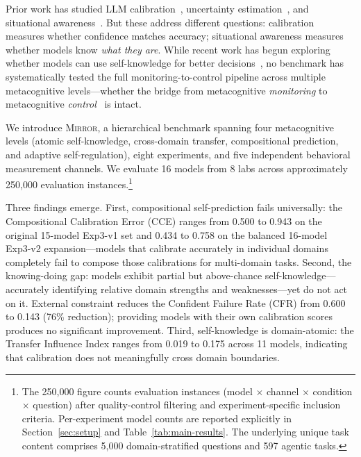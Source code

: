 \documentclass[10pt]{article}
\newcommand{\mirror}{\textsc{Mirror}}
\newcommand{\CCE}{CCE}
\newcommand{\CFR}{CFR}
\begin{document}
Prior work has studied LLM calibration~\citep{kadavath2022language,
kapoor2024calibration}, uncertainty estimation~\citep{lin2024generating}, and
situational awareness~\citep{laine2024me}. But these address different questions:
calibration measures whether confidence matches accuracy; situational awareness
measures whether models know \textit{what they are}. While recent work has begun exploring whether models can use self-knowledge for better decisions~\citep{schmied2026greedy, qiao2025agentic}, no benchmark has systematically tested the full monitoring-to-control pipeline across multiple metacognitive levels---whether the bridge from metacognitive \textit{monitoring} to
metacognitive \textit{control}~\citep{nelson1990metamemory} is intact.

We introduce \mirror{}, a hierarchical benchmark spanning four metacognitive levels
(atomic self-knowledge, cross-domain transfer, compositional prediction, and
adaptive self-regulation), eight experiments, and five independent behavioral
measurement channels. We evaluate 16 models from 8 labs across approximately
250,000 evaluation instances.\footnote{The 250,000 figure counts evaluation instances (model $\times$ channel $\times$ condition $\times$ question) after quality-control filtering and experiment-specific inclusion criteria. Per-experiment model counts are reported explicitly in Section~\ref{sec:setup} and Table~\ref{tab:main-results}. The underlying unique task content comprises 5,000 domain-stratified questions and 597 agentic tasks.}

Three findings emerge. First, compositional self-prediction fails universally: the Compositional Calibration Error (\CCE{}) ranges from 0.500 to 0.943 on the original 15-model Exp3-v1 set and 0.434 to 0.758 on the balanced 16-model Exp3-v2 expansion---models that calibrate accurately in individual domains completely fail to
compose those calibrations for multi-domain tasks. Second, the knowing-doing gap:
models exhibit partial but above-chance self-knowledge---accurately identifying
relative domain strengths and weaknesses---yet do not act on it. External constraint
reduces the Confident Failure Rate (\CFR{}) from 0.600 to 0.143 (76\% reduction);
providing models with their own calibration scores produces no significant
improvement. Third, self-knowledge is domain-atomic: the Transfer Influence Index
ranges from 0.019 to 0.175 across 11 models, indicating that calibration does not
meaningfully cross domain boundaries.
\end{document}
